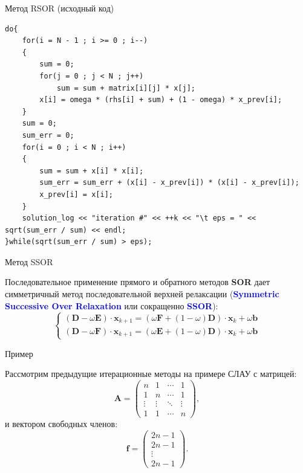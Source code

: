 \documentclass[10pt,xcolor=pst,aspectratio=169]{beamer}
\begin{document}
\begin{frame}[fragile]{Метод RSOR (исходный код)}

	\transdissolve[duration=0.2]
	\begin{lstlisting}
do{
    for(i = N - 1 ; i >= 0 ; i--)
    {
        sum = 0;
        for(j = 0 ; j < N ; j++)
            sum = sum + matrix[i][j] * x[j];
        x[i] = omega * (rhs[i] + sum) + (1 - omega) * x_prev[i];
    }
    sum = 0;
    sum_err = 0;
    for(i = 0 ; i < N ; i++)
    {
        sum = sum + x[i] * x[i];
        sum_err = sum_err + (x[i] - x_prev[i]) * (x[i] - x_prev[i]);
        x_prev[i] = x[i];
    }
    solution_log << "iteration #" << ++k << "\t eps = " << sqrt(sum_err / sum) << endl;
}while(sqrt(sum_err / sum) > eps);
	\end{lstlisting}

\end{frame}

\begin{frame}{Метод SSOR}

	\transdissolve[duration=0.2]
	\justifying
	\large
	Последовательное применение прямого и обратного методов \textbf{SOR} дает симметричный метод последовательной верхней релаксации (\textbf{\textcolor{blue}{Symmetric Successive Over Relaxation}} или сокращенно \textbf{\textcolor{blue}{SSOR}}):
	\[
		\begin{cases}
			(\textbf{D} - \omega \textbf{E}) \cdot \textbf{x}_{k+1} = (\omega \textbf{F} + (1 - \omega) \textbf{D}) \cdot \textbf{x}_{k} + \omega \textbf{b} \\
			(\textbf{D} - \omega \textbf{F}) \cdot \textbf{x}_{k+1} = (\omega \textbf{E} + (1 - \omega) \textbf{D}) \cdot \textbf{x}_{k} + \omega \textbf{b}
		\end{cases}
	\]

\end{frame}

\begin{frame}{Пример}

	\transdissolve[duration=0.2]
	\justifying
	\large
	Рассмотрим предыдущие итерационные методы на примере СЛАУ с матрицей:
	\begin{equation}
		\textbf{A} =
		\begin{pmatrix}
n & 1 & \cdots & 1 \\
1 & n & \cdots & 1 \\        
\vdots & \vdots & \ddots & \vdots \\
1 & 1 & \cdots & n
		\end{pmatrix},
		\label{eqn:example_A}
	\end{equation}
	и вектором свободных членов:
	\begin{equation}
		\textbf{f} =
		\begin{pmatrix}
2 n - 1 \\
2 n - 1 \\        
\vdots \\
2 n - 1
		\end{pmatrix}.
		\label{eqn:example_f}
	\end{equation}

\end{frame}
\end{document}
